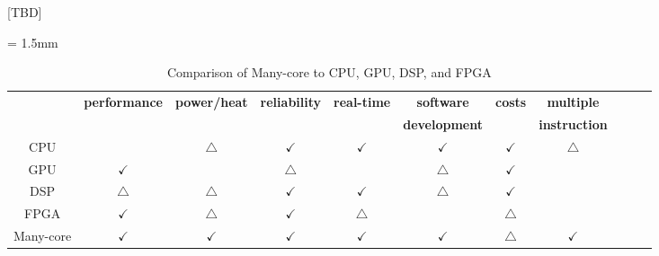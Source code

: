 \documentclass{sig-alternate-05-2015}
\begin{document}
[TBD]








\renewcommand{\arraystretch}{2.0}
\begin{table}[t]
  \caption{\label{tb:comparison_manu-core}
    Comparison of Many-core to CPU, GPU, DSP, and FPGA}
  \centering
  \scriptsize	                    %
  \tabcolsep = 1.5mm              %
  \begin{tabular}{c|cccccccccc}
    \hline
    & \multirow{2}{*}{\textbf{performance}} & \multirow{2}{*}{\textbf{power/heat}} & \multirow{2}{*}{\textbf{reliability}} & \multirow{2}{*}{\textbf{real-time}} & \textbf{software} & \multirow{2}{*}{\textbf{costs}} & \textbf{multiple}\\
    &&&&& \textbf{development} && \textbf{instruction} \\
    \hline
    \hline
    CPU & & \(\bigtriangleup\) & \(\checkmark\) & \(\checkmark\) & \(\checkmark\) & \(\checkmark\) & \(\bigtriangleup\) \\
    GPU & \(\checkmark\) &  & \(\bigtriangleup\) &  & \(\bigtriangleup\) & \(\checkmark\)\\
    DSP & \(\bigtriangleup\) & \(\bigtriangleup\) & \(\checkmark\) & \(\checkmark\) & \(\bigtriangleup\) & \(\checkmark\) & \\
    FPGA & \(\checkmark\) & \(\bigtriangleup\) & \(\checkmark\) & \(\bigtriangleup\) &  & \(\bigtriangleup\) & \\
    Many-core & \(\checkmark\) & \(\checkmark\) & \(\checkmark\) & \(\checkmark\) & \(\checkmark\) & \(\bigtriangleup\) & \(\checkmark\) \\
    \hline
  \end{tabular}
  \vspace{-5mm}
\end{table}
\end{document}
